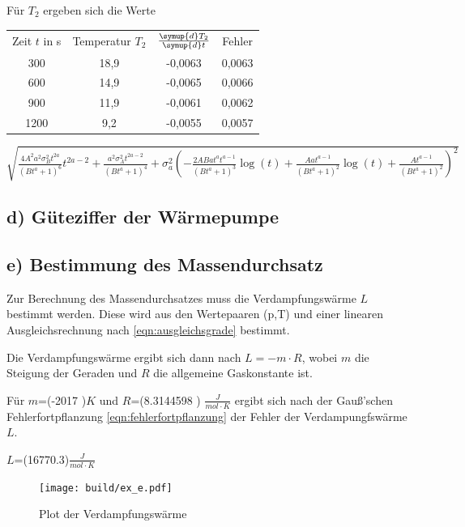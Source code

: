 Für $T_2$ ergeben sich die Werte 
\begin{table}
\begin{tabular}{cccc}
	Zeit $t$ in s & Temperatur $T_2$ & $\frac{\symup{d}T_2}{\symup{d}t}$ & Fehler \\
	300 & 18,9 & -0,0063 & 0,0063 \\
	600 & 14,9 & -0,0065 & 0,0066 \\
	900 & 11,9 & -0,0061 & 0,0062 \\
	1200 & 9,2 & -0,0055 & 0,0057 \\
\end{tabular}
\end{table}

$\sqrt{\frac{4 A^{2} a^{2} \sigma_{B}^{2} t^{2 a}}{\left(B t^{a} + 1\right)^{6}} t^{2 a - 2} + \frac{a^{2} \sigma_{A}^{2} t^{2 a - 2}}{\left(B t^{a} + 1\right)^{4}} + \sigma_{a}^{2} \left(- \frac{2 A B a t^{a} t^{a - 1}}{\left(B t^{a} + 1\right)^{3}} \log{\left (t \right )} + \frac{A a t^{a - 1}}{\left(B t^{a} + 1\right)^{2}} \log{\left (t \right )} + \frac{A t^{a - 1}}{\left(B t^{a} + 1\right)^{2}}\right)^{2}}$
\newpage


\subsection{d) Güteziffer der Wärmepumpe}

\subsection{e) Bestimmung des Massendurchsatz}
Zur Berechnung des Massendurchsatzes muss die Verdampfungswärme $L$ bestimmt werden.
Diese wird aus den Wertepaaren (p,T) und einer linearen Ausgleichsrechnung nach \eqref{eqn:ausgleichsgrade} bestimmt.

Die Verdampfungswärme ergibt sich dann nach $ L = −m \cdot R$, wobei $m$ die Steigung der Geraden und $R$ die allgemeine Gaskonstante ist.

Für $m$=(-2017 )$K$ und $R$=(8.3144598 ) $\frac{J}{mol\cdot K}$ \cite{gas}
ergibt sich nach der Gauß’schen Fehlerfortpflanzung \eqref{eqn:fehlerfortpflanzung} der Fehler der Verdampungfswärme $L$.

$L$=(16770.3)$\frac{J}{mol \cdot K}$


\begin{figure}
  \centering
  \texttt{[image: build/ex\_e.pdf]}
  \caption{Plot der Verdampfungswärme}
  \label{fig:verdampfungswaerme}
\end{figure}


